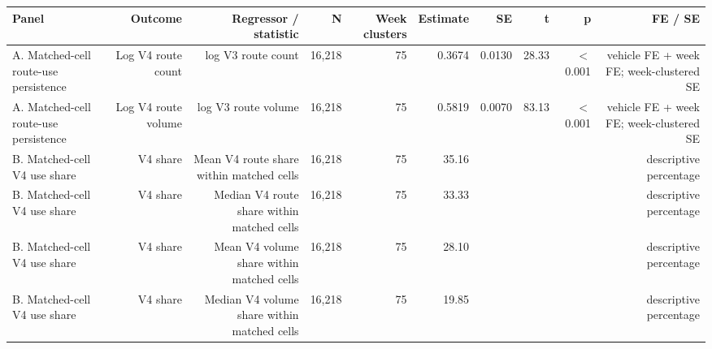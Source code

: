 \begin{tabular}{lrrrrrrrrr}
\toprule
Panel & Outcome & Regressor / statistic & N & Week clusters & Estimate & SE & t & p & FE / SE \\
\midrule
A. Matched-cell route-use persistence & Log V4 route count & log V3 route count & 16,218 & 75 & 0.3674 & 0.0130 & 28.33 & \ensuremath{<}0.001 & vehicle FE + week FE; week-clustered SE \\
A. Matched-cell route-use persistence & Log V4 route volume & log V3 route volume & 16,218 & 75 & 0.5819 & 0.0070 & 83.13 & \ensuremath{<}0.001 & vehicle FE + week FE; week-clustered SE \\
B. Matched-cell V4 use share & V4 share & Mean V4 route share within matched cells & 16,218 & 75 & 35.16 &  &  &  & descriptive percentage \\
B. Matched-cell V4 use share & V4 share & Median V4 route share within matched cells & 16,218 & 75 & 33.33 &  &  &  & descriptive percentage \\
B. Matched-cell V4 use share & V4 share & Mean V4 volume share within matched cells & 16,218 & 75 & 28.10 &  &  &  & descriptive percentage \\
B. Matched-cell V4 use share & V4 share & Median V4 volume share within matched cells & 16,218 & 75 & 19.85 &  &  &  & descriptive percentage \\
\bottomrule
\end{tabular}
